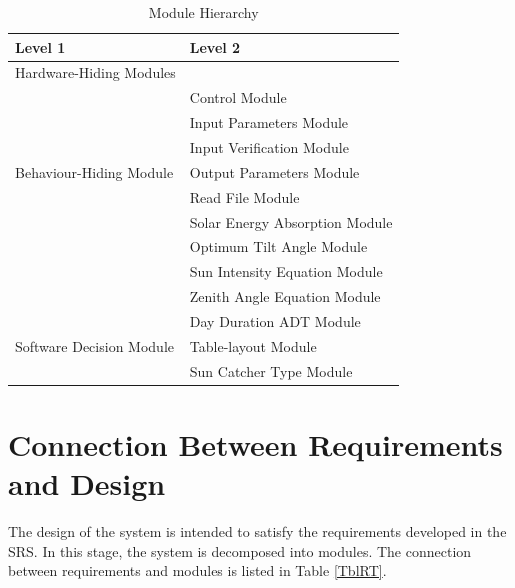 \documentclass[12pt, titlepage]{article}
\begin{document}
\begin{table}[h!]
\centering
\begin{tabular}{p{} p{}}
\toprule
\textbf{Level 1} & \textbf{Level 2}\\
\midrule

{Hardware-Hiding Modules} & ~ \\
\midrule

\multirow{7}{0.3\textwidth}{Behaviour-Hiding
 Module}& Control Module\\
& Input Parameters Module\\
& Input Verification Module\\
& Output Parameters Module\\
& Read File Module\\
& Solar Energy Absorption Module\\
& Optimum Tilt Angle Module\\
& Sun Intensity Equation Module\\
& Zenith Angle Equation Module\\
\midrule

\multirow{3}{0.3\textwidth}{Software Decision Module} 
& Day Duration ADT Module\\
& Table-layout Module\\
& Sun Catcher Type 
Module\\
\bottomrule

\end{tabular}
\caption{Module Hierarchy}
\label{TblMH}
\end{table}




\section{Connection Between Requirements and Design} \label{SecConnection}

The design of the system is intended to satisfy the requirements developed in
the SRS. In this stage, the system is decomposed into modules. The connection
between requirements and modules is listed in Table \ref{TblRT}.

\end{document}
